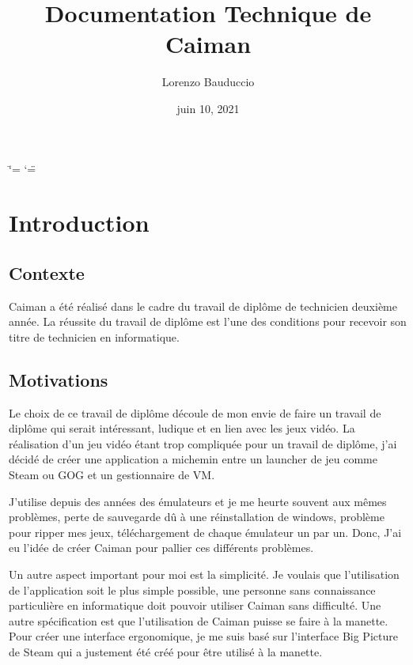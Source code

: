 \documentclass[a4paper,12pt,french]{sphinxmanual}
\title{Documentation Technique de Caiman}
\date{juin 10, 2021}
\author{Lorenzo Bauduccio}
\begin{document}
\ifdefined\shorthandoff
  \ifnum\catcode`\=\string=\active\shorthandoff{=}\fi
  \ifnum\catcode`\"=\active{}\fi
\fi

\pagestyle{empty}
\sphinxmaketitle
\pagestyle{plain}
\sphinxtableofcontents
\pagestyle{normal}
\label{\detokenize{index::doc}}



\chapter{Introduction}
\label{\detokenize{introduction:introduction}}\label{\detokenize{introduction::doc}}

\section{Contexte}
\label{\detokenize{introduction:contexte}}
\sphinxAtStartPar
Caiman a été réalisé dans le cadre du travail de diplôme de technicien deuxième année. La réussite du travail de diplôme est l’une des conditions pour recevoir son titre de technicien en informatique.


\section{Motivations}
\label{\detokenize{introduction:motivations}}
\sphinxAtStartPar
Le choix de ce travail de diplôme découle de mon envie de faire un travail de diplôme qui serait intéressant, ludique et en lien avec les jeux vidéo. La réalisation d’un jeu vidéo étant trop compliquée pour un travail de diplôme, j’ai décidé de créer une application a mi\sphinxhyphen{}chemin entre un launcher de jeu comme Steam ou GOG et un gestionnaire de VM.

\sphinxAtStartPar
J’utilise depuis des années des émulateurs et je me heurte souvent aux mêmes problèmes, perte de sauvegarde dû à une réinstallation de windows, problème pour ripper mes jeux, téléchargement de chaque émulateur un par un. Donc, J’ai eu l’idée de créer Caiman pour pallier ces différents problèmes.

\sphinxAtStartPar
Un autre aspect important pour moi est la simplicité. Je voulais que l’utilisation de l’application soit le plus simple possible, une personne sans connaissance particulière en informatique doit pouvoir utiliser Caiman sans difficulté. Une autre spécification est que l’utilisation de Caiman puisse se faire à la manette. Pour créer une interface ergonomique, je me suis basé sur l’interface Big Picture de Steam qui a justement été créé pour être utilisé  à la manette.
\end{document}
